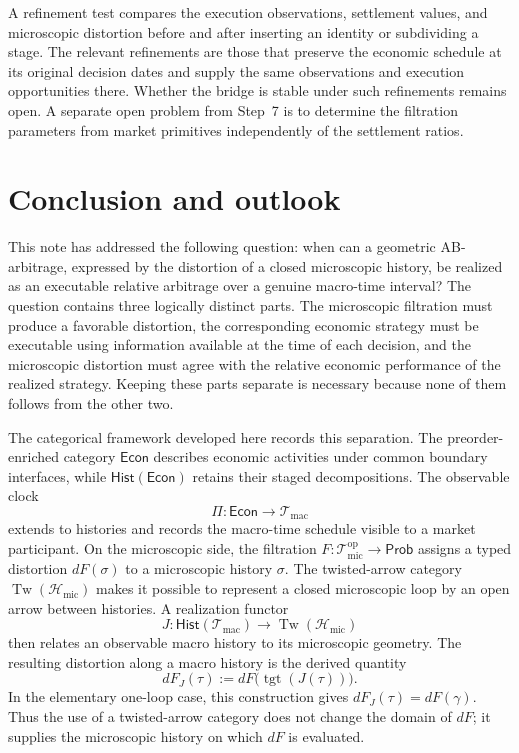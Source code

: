 \documentclass[11pt,a4paper]{article}
\newcommand{\Econ}{\mathsf{Econ}}
\newcommand{\Prob}{\mathsf{Prob}}
\newcommand{\Hist}{\mathsf{Hist}}
\newcommand{\Tw}{\operatorname{Tw}}
\newcommand{\Tmic}{\mathcal T_{\mathrm{mic}}}
\newcommand{\Tmac}{\mathcal T_{\mathrm{mac}}}
\newcommand{\Hmic}{\mathcal H_{\mathrm{mic}}}
\DeclareMathOperator{\tgt}{tgt}
\begin{document}
A refinement test compares the execution observations, settlement values,
and microscopic distortion before and after inserting an identity or
subdividing a stage. The relevant refinements are those that preserve
the economic schedule at its original decision dates and supply the
same observations and execution opportunities there. Whether the bridge
is stable under such refinements remains open. A separate open problem
from Step~7 is to determine the filtration parameters from market
primitives independently of the settlement ratios.

\section{Conclusion and outlook}
\label{conclusion}

This note has addressed the following question: when can a geometric
AB-arbitrage, expressed by the distortion of a closed microscopic
history, be realized as an executable relative arbitrage over a genuine
macro-time interval?  The question contains three logically distinct
parts.  The microscopic filtration must produce a favorable distortion,
the corresponding economic strategy must be executable using information
available at the time of each decision, and the microscopic distortion
must agree with the relative economic performance of the realized
strategy.  Keeping these parts separate is necessary because none of
them follows from the other two.

The categorical framework developed here records this separation.  The
preorder-enriched category \(\Econ\) describes economic activities under
common boundary interfaces, while \(\Hist(\Econ)\) retains their staged
decompositions.  The observable clock
\[
  \Pi:\Econ\longrightarrow\Tmac
\]
extends to histories and records the macro-time schedule visible to a
market participant.  On the microscopic side, the filtration
\(F:\Tmic^{\mathrm{op}}\to\Prob\) assigns a typed distortion
\(dF(\sigma)\) to a microscopic history \(\sigma\).  The twisted-arrow
category \(\Tw(\Hmic)\) makes it possible to represent a closed
microscopic loop by an open arrow between histories.  A realization
functor
\[
  J:\Hist(\Tmac)\longrightarrow\Tw(\Hmic)
\]
then relates an observable macro history to its microscopic geometry.
The resulting distortion along a macro history is the derived quantity
\[
  dF_J(\tau)
  :=dF\bigl(\tgt(J(\tau))\bigr).
\]
In the elementary one-loop case, this construction gives
\(dF_J(\tau)=dF(\gamma)\).  Thus the use of a twisted-arrow category does
not change the domain of \(dF\); it supplies the microscopic history on
which \(dF\) is evaluated.
\end{document}
